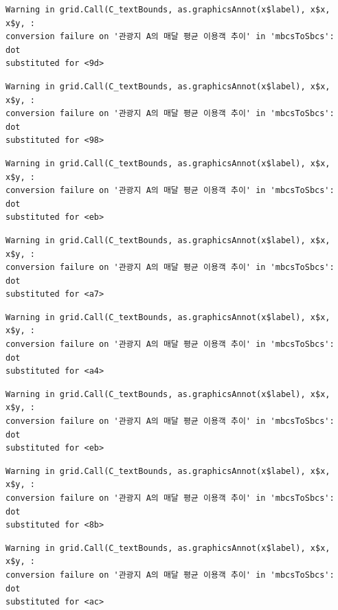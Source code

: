 \documentclass[
  letterpaper,
  DIV=11,
  numbers=noendperiod]{scrreprt}
\begin{document}
\begin{verbatim}
Warning in grid.Call(C_textBounds, as.graphicsAnnot(x$label), x$x, x$y, :
conversion failure on '관광지 A의 매달 평균 이용객 추이' in 'mbcsToSbcs': dot
substituted for <9d>
\end{verbatim}

\begin{verbatim}
Warning in grid.Call(C_textBounds, as.graphicsAnnot(x$label), x$x, x$y, :
conversion failure on '관광지 A의 매달 평균 이용객 추이' in 'mbcsToSbcs': dot
substituted for <98>
\end{verbatim}

\begin{verbatim}
Warning in grid.Call(C_textBounds, as.graphicsAnnot(x$label), x$x, x$y, :
conversion failure on '관광지 A의 매달 평균 이용객 추이' in 'mbcsToSbcs': dot
substituted for <eb>
\end{verbatim}

\begin{verbatim}
Warning in grid.Call(C_textBounds, as.graphicsAnnot(x$label), x$x, x$y, :
conversion failure on '관광지 A의 매달 평균 이용객 추이' in 'mbcsToSbcs': dot
substituted for <a7>
\end{verbatim}

\begin{verbatim}
Warning in grid.Call(C_textBounds, as.graphicsAnnot(x$label), x$x, x$y, :
conversion failure on '관광지 A의 매달 평균 이용객 추이' in 'mbcsToSbcs': dot
substituted for <a4>
\end{verbatim}

\begin{verbatim}
Warning in grid.Call(C_textBounds, as.graphicsAnnot(x$label), x$x, x$y, :
conversion failure on '관광지 A의 매달 평균 이용객 추이' in 'mbcsToSbcs': dot
substituted for <eb>
\end{verbatim}

\begin{verbatim}
Warning in grid.Call(C_textBounds, as.graphicsAnnot(x$label), x$x, x$y, :
conversion failure on '관광지 A의 매달 평균 이용객 추이' in 'mbcsToSbcs': dot
substituted for <8b>
\end{verbatim}

\begin{verbatim}
Warning in grid.Call(C_textBounds, as.graphicsAnnot(x$label), x$x, x$y, :
conversion failure on '관광지 A의 매달 평균 이용객 추이' in 'mbcsToSbcs': dot
substituted for <ac>
\end{verbatim}
\end{document}
